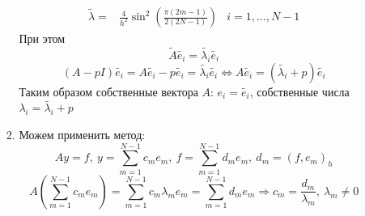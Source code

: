 \documentclass[12pt]{article}
\begin{document}
\begin{enumerate}[I.]
\begin{enumerate}
\begin{enumerate}
\begin{align*}
				                  \tilde{\lambda}= & \frac{4}{h^2}\sin^2\left(\frac{\pi(2m-1)}{2(2N-1)}\right) & i=1,\ldots,N-1
			                  \end{align*}
			                  При этом
			                  \[\tilde{A}\tilde{e_i}=\tilde{\lambda_i}\tilde{e_i}\]
			                  \[(A-pI)\tilde{e_i}=A\tilde{e_i}-p\tilde{e_i}=\tilde{\lambda_i}\tilde{e_i}\Leftrightarrow A\tilde{e_i}=(\tilde{\lambda_i}+p)\tilde{e_i}\]
			                  Таким образом собственные вектора $A$: $e_i = \tilde{e_i}$, собственные числа $\lambda_i=\tilde{\lambda_i}+p$
			            \item Можем применить метод:
			                  \[Ay=f,\ y=\sum_{m=1}^{N-1}c_me_m,\ f=\sum_{m=1}^{N-1}d_me_m,\ d_m=(f,e_m)_h\]
			                  \[A\left(\sum_{m=1}^{N-1}c_me_m\right)=\sum_{m=1}^{N-1}c_m\lambda_me_m=\sum_{m=1}^{N-1}d_me_m\Rightarrow c_m=\frac{d_m}{\lambda_m},\ \lambda_m\neq0\]
		            \end{enumerate}

		            \newpage


\end{enumerate}
\end{enumerate}
\end{document}
